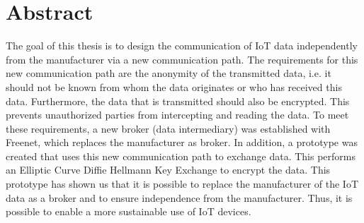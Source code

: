 \chapter*{Abstract}
\thispagestyle{empty}

The goal of this thesis is to design the communication of IoT data independently from the manufacturer via a new communication path. The requirements for this new communication path are the anonymity of the transmitted data, i.e. it should not be known from whom the data originates or who has received this data. Furthermore, the data that is transmitted should also be encrypted. This prevents unauthorized parties from intercepting and reading the data. 
To meet these requirements, a new broker (data intermediary) was established with Freenet, which replaces the manufacturer as broker. In addition, a prototype was created that uses this new communication path to exchange data. This performs an Elliptic Curve Diffie Hellmann Key Exchange to encrypt the data. 
This prototype has shown us that it is possible to replace the manufacturer of the IoT data as a broker and to ensure independence from the manufacturer. Thus, it is possible to enable a more sustainable use of IoT devices.

\clearpage
